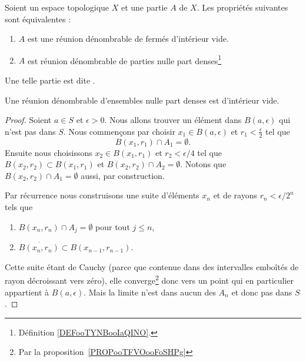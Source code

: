 \begin{definition}	\label{DEFooYKHUooPGZvLz}
	Soient un espace topologique \( X\) et une partie \( A\) de \( X\). Les propriétés suivantes sont équivalentes :
	\begin{enumerate}
		\item
		      \( A\) est une réunion dénombrable de fermés d'intérieur vide.
		\item
		      \( A\) est réunion dénombrable de parties nulle part denses\footnote{Définition \ref{DEFooTYNBooIaQINO}.}
	\end{enumerate}
	Une telle partie est dite .
\end{definition}


\begin{theorem}      \label{ThoQGalIO}
	Une réunion dénombrable d'ensembles nulle part denses est d'intérieur vide.
\end{theorem}

\begin{proof}
	Soient \( a\in S\) et \( \epsilon>0\). Nous allons trouver un élément dans \( B(a,\epsilon)\) qui n'est pas dans \( S\). Nous commençons par choisir \( x_1\in B(a,\epsilon)\) et \( r_1<\frac{ \epsilon }{2}\) tel que
	\begin{equation}
		B(x_1,r_1)\cap A_1=\emptyset.
	\end{equation}
	Ensuite nous choisissons \( x_2\in B(x_1,r_1)\) et \( r_2<\epsilon/4\) tel que \( B(x_2,r_2)\subset B(x_1,r_1)\) et \( B(x_2,r_2)\cap A_2=\emptyset\). Notons que \( B(x_2,r_2)\cap A_1=\emptyset\) aussi, par construction.

	Par récurrence nous construisons une suite d'éléments \( x_n\) et de rayons \( r_n<\epsilon/2^n\) tels que
	\begin{enumerate}
		\item
		      \( B(x_n,r_n)\cap A_j=\emptyset\) pour tout \( j\leq n\),
		\item
		      \( \overline{ B(x_n,r_n) }\subset B(x_{n-1},r_{n-1})\).
	\end{enumerate}
	Cette suite étant de Cauchy (parce que contenue dans des intervalles emboîtés de rayon décroissant vers zéro), elle converge\footnote{Par la proposition~\ref{PROPooTFVOooFoSHPg}} donc vers un point qui en particulier appartient à \( B(a,\epsilon)\). Mais la limite n'est dans aucun des \( A_n\) et donc pas dans \( S\).
\end{proof}

